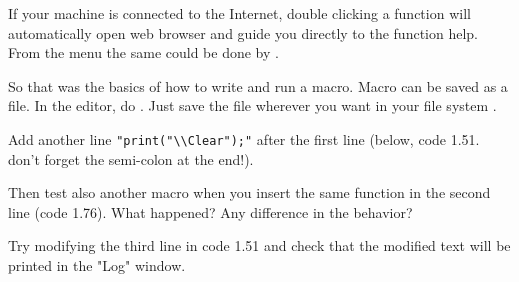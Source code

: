 If your machine is connected to the Internet, double clicking a function will automatically open web browser and guide you directly to the function help. From the menu the same could be done by .

So that was the basics of how to write and run a macro. Macro can be saved as a file.
In the editor, do . Just save the file wherever you want in your file system . 

\begin{indentexercise}{1}
\item Add another line \texttt{"print("\textbackslash{}\textbackslash{}Clear");"} 
after the first line (below, code 1.51. don't forget the semi-colon at the end!). 
\item 
Then test also another macro when you insert the same function in the second line (code 1.76). 
What happened? Any difference in the behavior? 
\item 
\end{indentexercise}

\begin{indentexercise}{2}
\item Try modifying the third line in code 1.51
and check that the modified text will be printed in the "Log" window. \\
\end{indentexercise}

